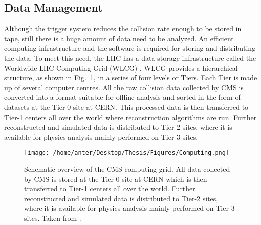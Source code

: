 \subsection{Data Management}
Although the trigger system reduces the collision rate enough to be stored in tape, still there is a huge amount of data need to be analyzed. An efficient computing infrastructure and the software is required for storing and distributing the data. To meet this need, the LHC has a data storage infrastructure called the Worldwide LHC Computing Grid (WLCG) \cite{Bird:2005js}. WLCG provides a hierarchical structure, as shown in Fig.~\ref{fig:Computing}, in a series of four levels or Tiers. Each Tier is made up of several computer centres. All the raw collision data collected by CMS is converted into a format suitable for offline analysis and sorted in the form of datasets at the Tier-0 site at CERN. This processed data is then transferred to Tier-1 centers all over the world where reconstruction algorithms are run. Further reconstructed and simulated data is distributed to Tier-2 sites, where it is available for physics analysis mainly performed on Tier-3 sites. %

\begin{figure}[!h]
\begin{center}
\vspace*{3mm} 
\hspace*{-5mm}
\texttt{[image: /home/anter/Desktop/Thesis/Figures/Computing.png]}\\
\vspace*{4mm}
\caption{Schematic overview of the CMS computing grid. All data collected by CMS is stored at the Tier-0 site at CERN which is then transferred to Tier-1 centers all over the world. Further reconstructed and simulated data is distributed to Tier-2 sites, where it is available for physics analysis mainly performed on Tier-3 sites. Taken from \cite{Bird:2005js}.}
\label{fig:Computing}
\end{center}
\end{figure}
